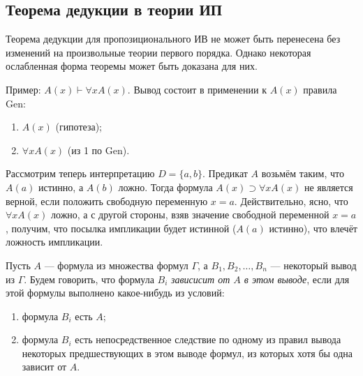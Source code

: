 \subsection{Теорема дедукции в теории ИП}
Теорема дедукции для пропозиционального ИВ не может быть перенесена без изменений на произвольные теории первого порядка. Однако некоторая ослабленная форма теоремы может быть доказана для них.

Пример: $A(x) \vdash \forall xA(x)$. Вывод состоит в применении к $A(x)$ правила Gen:
\begin{enumerate}
    \item $A(x)$ (гипотеза);
    \item $\forall xA(x)$ (из 1 по Gen).
\end{enumerate}
Рассмотрим теперь интерпретацию $D = \{a, b\}$. Предикат $A$ возьмём таким, что $A(a)$ истинно, а $A(b)$ ложно. Тогда формула $A(x) \supset \forall xA(x)$ не является верной, если положить свободную переменную $x = a$. Действительно, ясно, что $\forall xA(x)$ ложно, а с другой стороны, взяв значение свободной переменной $x = a$, получим, что посылка импликации будет истинной ($A(a)$ истинно), что влечёт ложность импликации.

Пусть $A$ --- формула из множества формул $\Gamma$, а $B_1, B_2, \dots, B_n$ --- некоторый вывод из $\Gamma$. Будем говорить, что формула $B_i$ \textit{зависисит от $A$ в этом выводе}, если для этой формулы выполнено какое-нибудь из условий:
\begin{enumerate}
    \item формула $B_i$ есть $A$;
    \item формула $B_i$ есть непосредственное следствие по одному из правил вывода некоторых предшествующих в этом выводе формул, из которых хотя бы одна зависит от $A$.
\end{enumerate}

